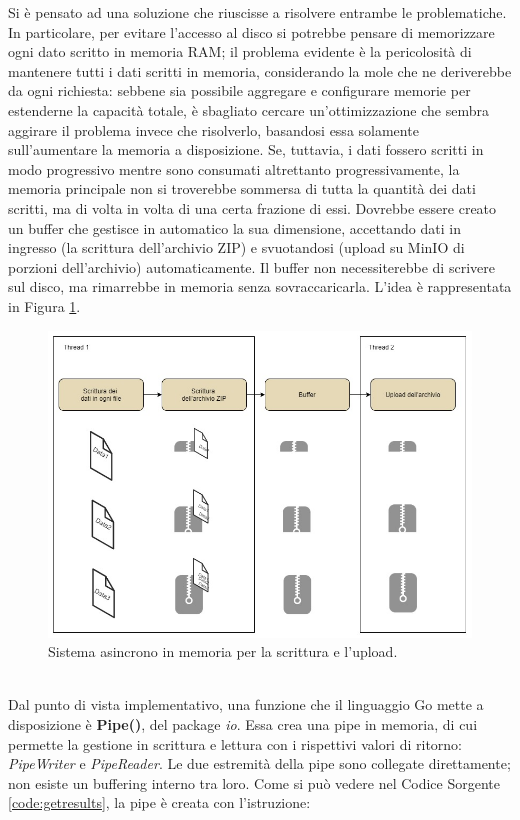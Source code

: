 Si è pensato ad una soluzione che riuscisse a risolvere entrambe le problematiche. In particolare, per evitare l'accesso al disco si potrebbe pensare di memorizzare ogni dato scritto in memoria RAM; il problema evidente è la pericolosità di mantenere tutti i dati scritti in memoria, considerando la mole che ne deriverebbe da ogni richiesta: sebbene sia possibile aggregare e configurare memorie per estenderne la capacità totale, è sbagliato cercare un'ottimizzazione che sembra aggirare il problema invece che risolverlo, basandosi essa solamente sull'aumentare la memoria a disposizione. Se, tuttavia, i dati fossero scritti in modo progressivo mentre sono consumati altrettanto progressivamente, la memoria principale non si troverebbe sommersa di tutta la quantità dei dati scritti, ma di volta in volta di una certa frazione di essi. Dovrebbe essere creato un buffer che gestisce in automatico la sua dimensione, accettando dati in ingresso (la scrittura dell'archivio ZIP) e svuotandosi (upload su MinIO di porzioni dell'archivio) automaticamente. Il buffer non necessiterebbe di scrivere sul disco, ma rimarrebbe in memoria senza sovraccaricarla. L'idea è rappresentata in Figura \ref{fig:pipe}. 
\begin{figure}[h!]
    \centering
    \includegraphics[width=\textwidth]{images/pipe.jpg}
    \caption{Sistema asincrono in memoria per la scrittura e l'upload.}
    \label{fig:pipe}
\end{figure}\\
Dal punto di vista implementativo, una funzione che il linguaggio Go mette a disposizione è \textbf{Pipe()}, del package \textit{io}. Essa crea una pipe in memoria, di cui permette la gestione in scrittura e lettura con i rispettivi valori di ritorno: \textit{PipeWriter} e \textit{PipeReader}. Le due estremità della pipe sono collegate direttamente; non esiste un buffering interno tra loro. Come si può vedere nel Codice Sorgente \ref{code:getresults}, la pipe è creata con l'istruzione:
